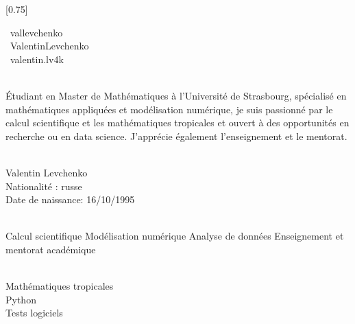 \documentclass[lighthipster]{simplehipstercv}
\begin{document}
\setlength{\columnsep}{1.5cm}
[0.75]
\begin{paracol}{2}

\paracolbackgroundoptions



\footnotesize
{\setasidefontcolour
\flushright
\begin{center}
\end{center}


\faLinkedin~vallevchenko \hspace{1.5em}\\
\faGithub~ValentinLevchenko \hspace{1.5em}\\
\faInstagram~valentin.lv4k\\
\bigskip


\\[0.5em]

{\footnotesize
Étudiant en Master de Mathématiques à l’Université de Strasbourg, spécialisé en mathématiques appliquées et modélisation numérique, 
je suis passionné par le calcul scientifique et les mathématiques tropicales et ouvert à des opportunités en recherche ou en 
data science. J'apprécie également l'enseignement et le mentorat.\\}
\bigskip

 \\[0.5em]
Valentin Levchenko\\
Nationalité : russe\\
Date de naissance: 16/10/1995



\bigskip

 \\[0.5em]

Calcul scientifique
Modélisation numérique
Analyse de données
Enseignement et mentorat académique

\bigskip

\\[0.5em]

Mathématiques tropicales\\
Python\\
Tests logiciels\\
\bigskip

}
\end{paracol}
\end{document}
